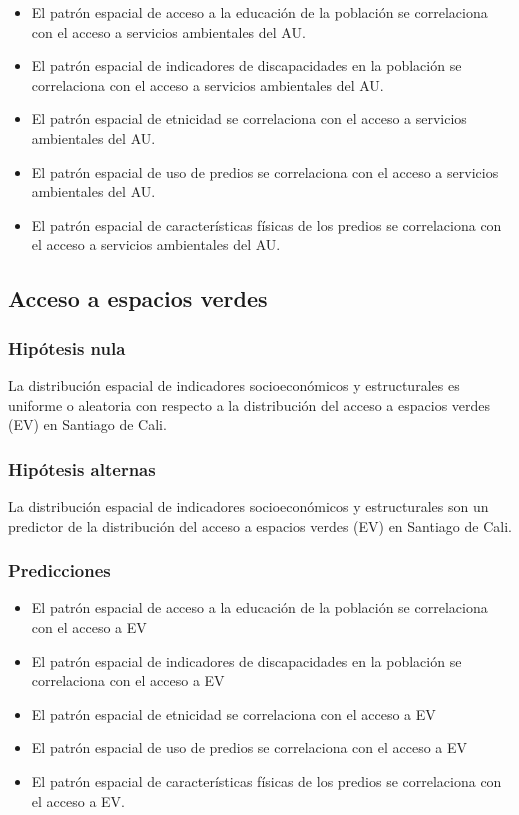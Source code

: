 \documentclass[12pt,a4paper,openany]{book}
\providecommand{\tightlist}{%
  \setlength{\itemsep}{0pt}\setlength{\parskip}{0pt}}
\theoremstyle{definition}
\theoremstyle{definition}
\theoremstyle{definition}
\theoremstyle{remark}
\begin{document}
\begin{itemize}
\tightlist
\item
  El patrón espacial de acceso a la educación de la población se
  correlaciona con el acceso a servicios ambientales del AU.
\item
  El patrón espacial de indicadores de discapacidades en la población se
  correlaciona con el acceso a servicios ambientales del AU.
\item
  El patrón espacial de etnicidad se correlaciona con el acceso a
  servicios ambientales del AU.
\item
  El patrón espacial de uso de predios se correlaciona con el acceso a
  servicios ambientales del AU.
\item
  El patrón espacial de características físicas de los predios se
  correlaciona con el acceso a servicios ambientales del AU.
\end{itemize}

\subsection{Acceso a espacios verdes}\label{acceso-a-espacios-verdes}

\subsubsection{Hipótesis nula}\label{hipuxf3tesis-nula-1}

La distribución espacial de indicadores socioeconómicos y estructurales
es uniforme o aleatoria con respecto a la distribución del acceso a
espacios verdes (EV) en Santiago de Cali.

\subsubsection{Hipótesis alternas}\label{hipuxf3tesis-alternas-1}

La distribución espacial de indicadores socioeconómicos y estructurales
son un predictor de la distribución del acceso a espacios verdes (EV) en
Santiago de Cali.

\subsubsection{Predicciones}\label{predicciones-1}

\begin{itemize}
\tightlist
\item
  El patrón espacial de acceso a la educación de la población se
  correlaciona con el acceso a EV
\item
  El patrón espacial de indicadores de discapacidades en la población se
  correlaciona con el acceso a EV
\item
  El patrón espacial de etnicidad se correlaciona con el acceso a EV
\item
  El patrón espacial de uso de predios se correlaciona con el acceso a
  EV
\item
  El patrón espacial de características físicas de los predios se
  correlaciona con el acceso a EV.
\end{itemize}
\end{document}
